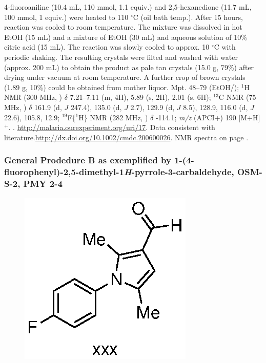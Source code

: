 \documentclass[12pt, a4paper,titlepage]{article}
\begin{document}
4-fluoroaniline (10.4 mL, 110 mmol, 1.1 equiv.) and 2,5-hexanedione (11.7 mL, 100 mmol, 1 equiv.) were heated to 110 $^\circ$C (oil bath temp.). After 15 hours, reaction was cooled to room temperature. The mixture was dissolved in hot EtOH (15 mL) and a mixture of EtOH (30 mL) and aqueous solution of 10\% citric acid (15 mL). The reaction was slowly cooled to approx. 10 $^\circ$C with periodic shaking. The resulting crystals were filted and washed with water (approx. 200 mL) to obtain the product as pale tan crystals (15.0 g, 79\%) after drying under vacuum at room temperature. A further crop of brown crystals (1.89 g, 10\%) could be obtained from mother liquor.
Mpt. 48--79 (EtOH/); 
$^1$H NMR (300 MHz, ) $\delta$ 7.21--7.11 (m, 4H), 5.89 (s, 2H), 2.01 (s, 6H); 
$^{13}$C NMR (75 MHz, ) $\delta$ 161.9 (d, $J$ 247.4), 135.0 (d, $J$ 2.7), 129.9 (d, $J$ 8.5), 128.9, 116.0 (d, $J$ 22.6), 105.8, 12.9; 
$^{19}$F\{$^1$H\} NMR (282 MHz, ) $\delta$ -114.1; 
\emph{m/z} (APCI+) 190 [M+H]$^+$. 
.
\url{http://malaria.ourexperiment.org/uri/17}. Data consistent with literature.\url{http://dx.doi.org/10.1002/cmdc.200600026}. NMR spectra on page \pageref{spec:PMY1}.

\subsubsection*{General Prodedure B as exemplified by 1-(4-fluorophenyl)-2,5-dimethyl-1\emph{H}-pyrrole-3-carbaldehyde, OSM-S-2, PMY 2-4}
\label{exp:PMY2}
	\begin{figure}[H]
	\begin{center}
	\includegraphics{exp/PMY2.eps}
	\end{center}
	\vspace{-25pt}	
	\end{figure}	
\end{document}
